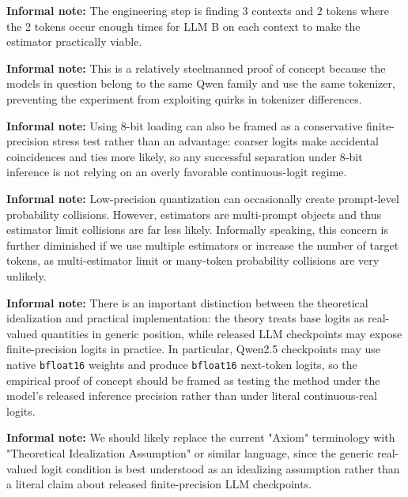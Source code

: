 \documentclass{article}
\begin{document}
\textbf{Informal note:} The engineering step is finding 3 contexts and 2 tokens where the 2 tokens occur enough times for LLM B on each context to make the estimator practically viable.

\textbf{Informal note:} This is a relatively steelmanned proof of concept because the models in question belong to the same Qwen family and use the same tokenizer, preventing the experiment from exploiting quirks in tokenizer differences.

\textbf{Informal note:} Using 8-bit loading can also be framed as a conservative finite-precision stress test rather than an advantage: coarser logits make accidental coincidences and ties more likely, so any successful separation under 8-bit inference is not relying on an overly favorable continuous-logit regime.

\textbf{Informal note:} Low-precision quantization can occasionally create prompt-level probability collisions. However, estimators are multi-prompt objects and thus estimator limit collisions are far less likely. Informally speaking, this concern is further diminished if we use multiple estimators or increase the number of target tokens, as multi-estimator limit or many-token probability collisions are very unlikely.

\textbf{Informal note:} There is an important distinction between the theoretical idealization and practical implementation: the theory treats base logits as real-valued quantities in generic position, while released LLM checkpoints may expose finite-precision logits in practice. In particular, Qwen2.5 checkpoints may use native \texttt{bfloat16} weights and produce \texttt{bfloat16} next-token logits, so the empirical proof of concept should be framed as testing the method under the model's released inference precision rather than under literal continuous-real logits.

\textbf{Informal note:} We should likely replace the current "Axiom" terminology with "Theoretical Idealization Assumption" or similar language, since the generic real-valued logit condition is best understood as an idealizing assumption rather than a literal claim about released finite-precision LLM checkpoints.


\begin{center}
\end{center}
\end{document}
